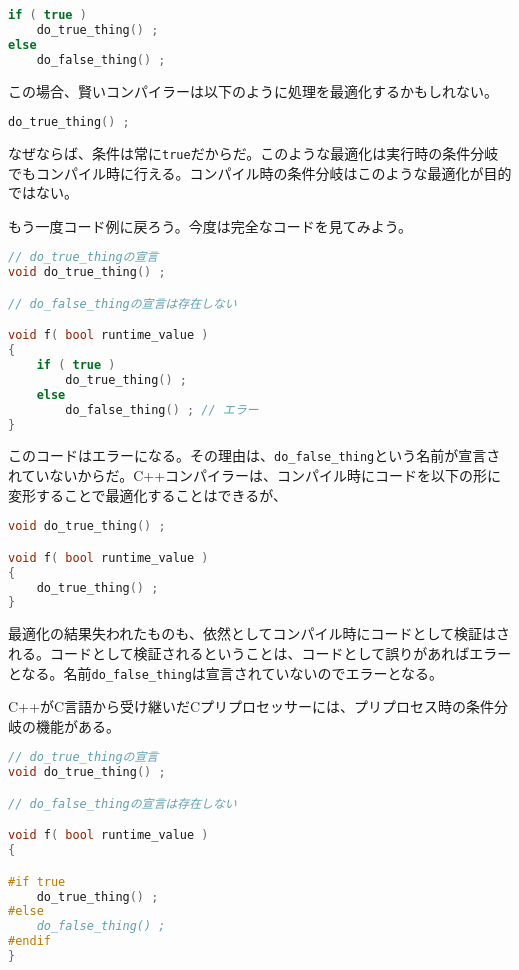 \begin{lstlisting}[language=C++]
if ( true )
    do_true_thing() ;
else
    do_false_thing() ;
\end{lstlisting}

この場合、賢いコンパイラーは以下のように処理を最適化するかもしれない。

\begin{lstlisting}[language=C++]
do_true_thing() ;
\end{lstlisting}

なぜならば、条件は常に\lstinline!true!だからだ。このような最適化は実行時の条件分岐でもコンパイル時に行える。コンパイル時の条件分岐はこのような最適化が目的ではない。

もう一度コード例に戻ろう。今度は完全なコードを見てみよう。

\begin{lstlisting}[language=C++]
// do_true_thingの宣言
void do_true_thing() ;

// do_false_thingの宣言は存在しない

void f( bool runtime_value )
{
    if ( true )
        do_true_thing() ;
    else
        do_false_thing() ; // エラー
}
\end{lstlisting}

このコードはエラーになる。その理由は、\lstinline!do_false_thing!という名前が宣言されていないからだ。C++コンパイラーは、コンパイル時にコードを以下の形に変形することで最適化することはできるが、
\begin{lstlisting}[language=C++]
void do_true_thing() ;

void f( bool runtime_value )
{
    do_true_thing() ;
}
\end{lstlisting}
最適化の結果失われたものも、依然としてコンパイル時にコードとして検証はされる。コードとして検証されるということは、コードとして誤りがあればエラーとなる。名前\lstinline!do_false_thing!は宣言されていないのでエラーとなる。

%

C++がC言語から受け継いだCプリプロセッサーには、プリプロセス時の条件分岐の機能がある。

\begin{lstlisting}[language=C++]
// do_true_thingの宣言
void do_true_thing() ;

// do_false_thingの宣言は存在しない

void f( bool runtime_value )
{

#if true
    do_true_thing() ;
#else
    do_false_thing() ;
#endif
}
\end{lstlisting}

